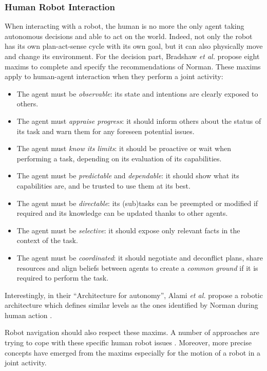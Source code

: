 \documentclass[a4paper,11pt,twoside]{StyleThese}
\begin{document}
\subsubsection{Human Robot Interaction}
When interacting with a robot, the human is no more the only agent taking autonomous decisions and able to act on the world. Indeed, not only the robot has its own plan-act-sense cycle with its own goal, but it can also physically move and change its environment. For the decision part, Bradshaw \textit{et al.} \cite{bradshaw2011human} propose eight maxims to complete and specify the recommendations of Norman. These maxims apply to human-agent interaction when they perform a joint activity:
\begin{itemize}
\item The agent must be \textit{observable}: its state and intentions are clearly exposed to others.
\item The agent must \textit{appraise progress}: it should inform others about the status of its task and warn them for any foreseen potential issues.
\item The agent must \textit{know its limits}: it should be proactive or wait when performing a task, depending on its evaluation of its capabilities.
\item The agent must be \textit{predictable} and \textit{dependable}: it should show what its capabilities are, and be trusted to use them at its best.
\item The agent must be \textit{directable}: its (sub)tasks can be preempted or modified if required and its knowledge can be updated thanks to other agents.
\item The agent must be \textit{selective}: it should expose only relevant facts in the context of the task.
\item The agent must be \textit{coordinated}: it should negotiate and deconflict plans, share resources and align beliefs between agents to create a \textit{common ground} if it is required to perform the task.
\end{itemize}

Interestingly, in their ``Architecture for autonomy'', Alami \textit{et al.} propose a robotic architecture which defines similar levels as the ones identified by Norman during human action \cite{alami1998architecture}.


Robot navigation should also respect these maxims. A number of approaches are trying to cope with these specific human robot issues \cite{kruse_human-aware_2013}. Moreover, more precise concepts have emerged from the maxims especially for the motion of a robot in a joint activity. 
\end{document}
